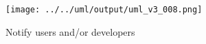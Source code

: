 \documentclass[a4paper]{scrreprt}
\newenvironment{longlisting}{\captionsetup{type=listing}}{}
\begin{document}
\begin{figure}[h!]
    \begin{center}
        \texttt{[image: ../../uml/output/uml\_v3\_008.png]}
        \caption{Notify users and/or developers}
        \label{fig:notify-users-developers}
    \end{center}
\end{figure}
%
%
\end{document}

